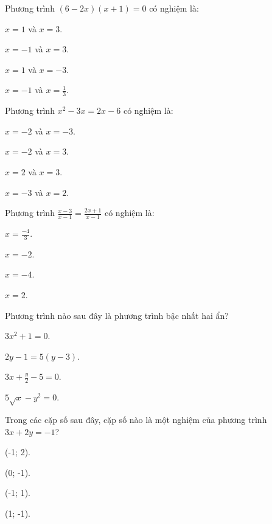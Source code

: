 \documentclass[%
    fontsize=12pt,%
    chapterprefix=false,%
    open=right,%
    twoside=false,%
    numbers=noenddot,%
    headings=optiontohead,%
    final,%
    DIV=15,%
    parskip=half %
]{scrbook}
\begin{document}
\begin{tracnghiem}

\item Phương trình $ (6 - 2x)(x + 1) = 0 $ có nghiệm là:
\begin{options}
  \item $ x = 1 $ và $ x = 3 $.
  \item $ x = -1 $ và $ x = 3 $.
  \item $ x = 1 $ và $ x = -3 $.
  \item $ x = -1 $ và $ x = \frac{1}{3} $.
\end{options}

\item Phương trình $ x^2 - 3x = 2x - 6 $ có nghiệm là:
\begin{options}
  \item $ x = -2 $ và $ x = -3 $.
  \item $ x = -2 $ và $ x = 3 $.
  \item $ x = 2 $ và $ x = 3 $.
  \item $ x = -3 $ và $ x = 2 $.
\end{options}

\item Phương trình $ \frac{x - 3}{x - 1} = \frac{2x + 1}{x - 1} $ có nghiệm là:
\begin{options}
  \item $ x = \frac{-4}{3} $.
  \item $ x = -2 $.
  \item $ x = -4 $.
  \item $ x = 2 $.
\end{options}

\item Phương trình nào sau đây là phương trình bậc nhất hai ẩn?
\begin{options}
  \item $ 3x^2 + 1 = 0 $.
  \item $ 2y - 1 = 5(y - 3) $.
  \item $ 3x + \frac{y}{2} - 5 = 0 $.
  \item $ 5\sqrt{x} - y^2 = 0 $.
\end{options}

\item Trong các cặp số sau đây, cặp số nào là một nghiệm của phương trình $ 3x + 2y = -1 $?
\begin{options}
  \item (-1; 2).
  \item (0; -1).
  \item (-1; 1).
  \item (1; -1).
\end{options}


\end{tracnghiem}
\end{document}
